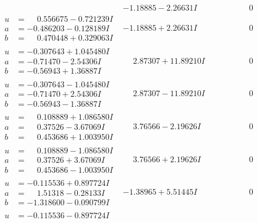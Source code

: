 \documentclass[1p]{elsarticle_modified}
\theoremstyle{definition}
\begin{document}
$$\begin{array}{c|c|c}
 & -1.18885 - 2.26631 I & \phantom{-0.000000 } 0 \\ \hline\begin{aligned}
u &= \phantom{-}0.556675 - 0.721239 I \\
a &= -0.486203 - 0.128189 I \\
b &= \phantom{-}0.470448 + 0.329063 I\end{aligned}
 & -1.18885 + 2.26631 I & \phantom{-0.000000 } 0 \\ \hline\begin{aligned}
u &= -0.307643 + 1.045480 I \\
a &= -0.71470 - 2.54306 I \\
b &= -0.56943 + 1.36887 I\end{aligned}
 & \phantom{-}2.87307 + 11.89210 I & \phantom{-0.000000 } 0 \\ \hline\begin{aligned}
u &= -0.307643 - 1.045480 I \\
a &= -0.71470 + 2.54306 I \\
b &= -0.56943 - 1.36887 I\end{aligned}
 & \phantom{-}2.87307 - 11.89210 I & \phantom{-0.000000 } 0 \\ \hline\begin{aligned}
u &= \phantom{-}0.108889 + 1.086580 I \\
a &= \phantom{-}0.37526 - 3.67069 I \\
b &= \phantom{-}0.453686 + 1.003950 I\end{aligned}
 & \phantom{-}3.76566 - 2.19626 I & \phantom{-0.000000 } 0 \\ \hline\begin{aligned}
u &= \phantom{-}0.108889 - 1.086580 I \\
a &= \phantom{-}0.37526 + 3.67069 I \\
b &= \phantom{-}0.453686 - 1.003950 I\end{aligned}
 & \phantom{-}3.76566 + 2.19626 I & \phantom{-0.000000 } 0 \\ \hline\begin{aligned}
u &= -0.115536 + 0.897724 I \\
a &= \phantom{-}1.51318 - 0.28133 I \\
b &= -1.318600 - 0.090799 I\end{aligned}
 & -1.38965 + 5.51445 I & \phantom{-0.000000 } 0 \\ \hline\begin{aligned}
u &= -0.115536 - 0.897724 I \\

\end{aligned}
\end{array}$$
\end{document}
